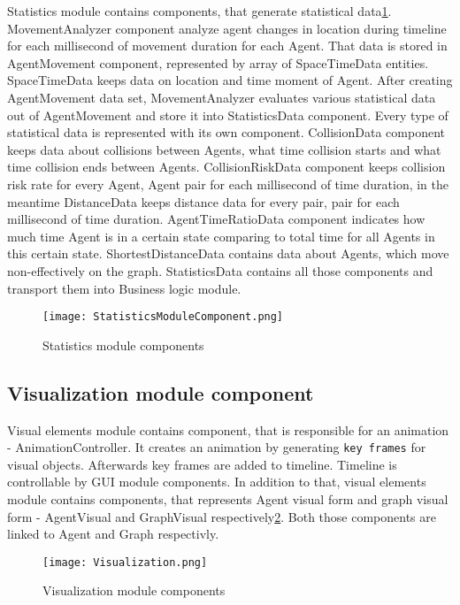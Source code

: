 \documentclass[thesis=B,english]{FITthesis}[2019/12/23]
\begin{document}
Statistics module contains components, that generate statistical data\ref{fig:float7}. MovementAnalyzer component analyze agent changes in location during timeline for each millisecond of movement duration for each Agent. That data is stored in AgentMovement component, represented by array of SpaceTimeData entities. SpaceTimeData keeps data on location and time moment of Agent. After creating AgentMovement data set, MovementAnalyzer evaluates various statistical data out of AgentMovement and store it into StatisticsData component. Every type of statistical data is represented with its own component. CollisionData component keeps data about collisions between Agents, what time collision starts and what time collision ends between Agents. CollisionRiskData component keeps collision risk rate for every {Agent, Agent} pair for each millisecond of time duration, in the meantime DistanceData keeps distance data for every {pair, pair} for each millisecond of time duration. AgentTimeRatioData component indicates how much time Agent is in a certain state comparing to total time for all Agents in this certain state. ShortestDistanceData contains data about Agents, which move non-effectively on the graph. StatisticsData contains all those components and transport them into Business logic module. 

\begin{figure}
	\texttt{[image: StatisticsModuleComponent.png]}
	\caption[Statistics]{Statistics module components}\label{fig:float7}
\end{figure}


\subsection{Visualization module component}

Visual elements module contains component, that is responsible for an animation - AnimationController. It creates an animation by generating \verb|key frames| for visual objects. Afterwards key frames are added to timeline. Timeline is controllable by GUI module components. In addition to that, visual elements module contains components, that represents Agent visual form and graph visual form - AgentVisual and GraphVisual respectively\ref{fig:float8}. Both those components are linked to Agent and Graph respectivly.

\begin{figure}
	\texttt{[image: Visualization.png]}
	\caption[Visualization module components]{Visualization module components}\label{fig:float8}
\end{figure}
\end{document}

